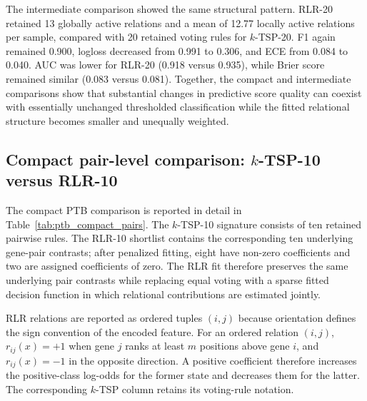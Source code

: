 \documentclass[11pt, a4paper]{article}
\begin{document}
The intermediate comparison showed the same structural pattern. RLR-20 retained 13 globally active relations and a mean of 12.77 locally active relations per sample, compared with 20 retained voting rules for $k$-TSP-20. F1 again remained 0.900, logloss decreased from 0.991 to 0.306, and ECE from 0.084 to 0.040. AUC was lower for RLR-20 (0.918 versus 0.935), while Brier score remained similar (0.083 versus 0.081). Together, the compact and intermediate comparisons show that substantial changes in predictive score quality can coexist with essentially unchanged thresholded classification while the fitted relational structure becomes smaller and unequally weighted.


\subsection{Compact pair-level comparison: $k$-TSP-10 versus RLR-10}

The compact PTB comparison is reported in detail in Table~\ref{tab:ptb_compact_pairs}. The $k$-TSP-10 signature consists of ten retained pairwise rules. The RLR-10 shortlist contains the corresponding ten underlying gene-pair contrasts; after penalized fitting, eight have non-zero coefficients and two are assigned coefficients of zero. The RLR fit therefore preserves the same underlying pair contrasts while replacing equal voting with a sparse fitted decision function in which relational contributions are estimated jointly.

RLR relations are reported as ordered tuples $(i,j)$ because orientation defines the sign convention of the encoded feature. For an ordered relation $(i,j)$, $r_{ij}(x)=+1$ when gene $j$ ranks at least $m$ positions above gene $i$, and $r_{ij}(x)=-1$ in the opposite direction. A positive coefficient therefore increases the positive-class log-odds for the former state and decreases them for the latter. The corresponding $k$-TSP column retains its voting-rule notation.
\end{document}
